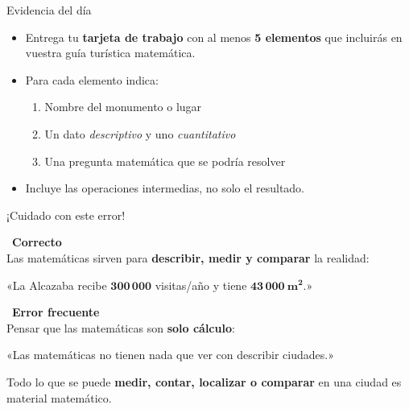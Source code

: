 \documentclass[aspectratio=169, 10pt, spanish]{beamer}
\begin{document}
\begin{frame}{Evidencia del día}
  \begin{evidenciabox}
    \begin{itemize}
      \item Entrega tu \textbf{tarjeta de trabajo} con
            al menos \textbf{5 elementos} que incluirás
            en vuestra guía turística matemática.
      \item Para cada elemento indica:
            \begin{enumerate}
              \item Nombre del monumento o lugar
              \item Un dato \textit{descriptivo} y uno \textit{cuantitativo}
              \item Una pregunta matemática que se podría resolver
            \end{enumerate}
      \item Incluye las operaciones intermedias, no solo el resultado.
    \end{itemize}
  \end{evidenciabox}
\end{frame}

\begin{frame}{¡Cuidado con este error!}
  \begin{errorbox}
    \begin{minipage}[t]{0.48\textwidth}
      \correcto\ \textbf{Correcto} \\[4pt]
      Las matemáticas sirven para \textbf{describir,
      medir y comparar} la realidad:\par
      «La Alcazaba recibe
      $\mathbf{300\,000}$ visitas/año
      y tiene $\mathbf{43\,000\ \text{m}^2}$.»
    \end{minipage}%
    \hfill%
    \begin{minipage}[t]{0.48\textwidth}
      \incorrecto\ \textbf{Error frecuente}\\[4pt]
      Pensar que las matemáticas son
      \textbf{solo cálculo}:\par
      «Las matemáticas no tienen nada que ver
      con describir ciudades.»
    \end{minipage}
  \end{errorbox}
  \begin{notabox}[Recuerda]
    
    Todo lo que se puede \textbf{medir, contar, localizar
    o comparar} en una ciudad es material matemático.
  \end{notabox}
\end{frame}
\end{document}
